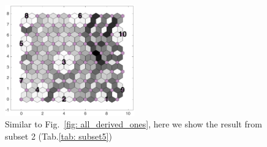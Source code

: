 \begin{figure}
        \centering
        \includegraphics[width=0.5\textwidth]{../../images0.01/M31/2D/image_subsets/subset5_dist_with_hits_t.png}
    \caption{Similar to Fig.~\ref{fig: all_derived_ones}, here we show the result  from subset 2 (Tab.\ref{tab: subset5})}
    \label{fig: subset5}
\end{figure}
